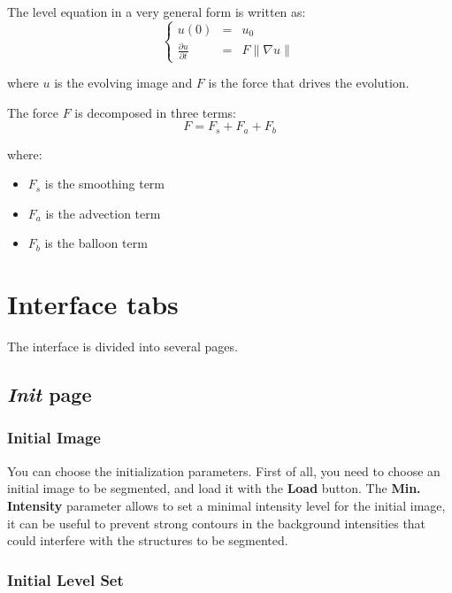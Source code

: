 \documentclass{article}
\begin{document}
The level equation in a very general form is written as:
\begin{equation}\label{eq:GenLS}
    \left\{ \begin{array}{lcl} u(0) &=& u_0 \\%
    \frac{\partial u}{\partial t} &=& F \| \nabla u \| \end{array} \right.
\end{equation}

where $u$ is the evolving image and $F$ is the force that drives the evolution.

The force $F$ is decomposed in three terms:
\begin{equation} \label{eq:LS_terms}
    F = F_s + F_a + F_b 
\end{equation}

where:
\begin{itemize}
   \item $F_s$ is the smoothing term
   \item $F_a$ is the advection term
   \item $F_b$ is the balloon term 
\end{itemize}


\section{Interface tabs}

The interface is divided into several pages.

\subsection{\emph{Init} page}

\subsubsection{Initial Image}
You can choose the initialization parameters.
First of all, you need to choose an initial image to be segmented, and load it with the {\bf Load} button.
The {\bf Min. Intensity} parameter allows to set a minimal intensity level for the initial image, it can be useful to prevent strong contours in the background intensities that could interfere with the structures to be segmented.


\subsubsection{Initial Level Set}
\end{document}
